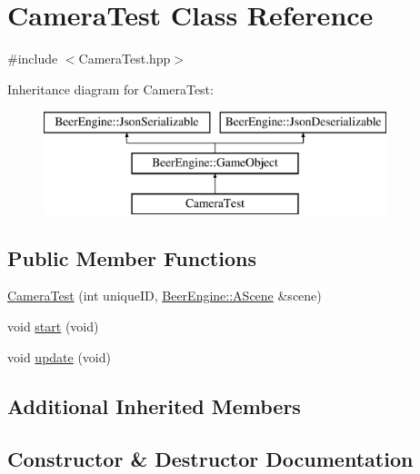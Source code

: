 \hypertarget{class_camera_test}{}\section{Camera\+Test Class Reference}
\label{class_camera_test}


{\ttfamily \#include $<$Camera\+Test.\+hpp$>$}

Inheritance diagram for Camera\+Test\+:\begin{figure}[H]
\begin{center}
\leavevmode
\includegraphics[height=3.000000cm]{class_camera_test}
\end{center}
\end{figure}
\subsection*{Public Member Functions}
\begin{DoxyCompactItemize}
\item 
\mbox{\hyperlink{class_camera_test_a87bcce0ea69a1a731e9e7743ecff602f}{Camera\+Test}} (int unique\+ID, \mbox{\hyperlink{class_beer_engine_1_1_a_scene}{Beer\+Engine\+::\+A\+Scene}} \&scene)
\item 
void \mbox{\hyperlink{class_camera_test_a33618b16d2906b67b68e55ad15a8a33b}{start}} (void)
\item 
void \mbox{\hyperlink{class_camera_test_a5bacc3399e57aa311e8d5ea39c9865bf}{update}} (void)
\end{DoxyCompactItemize}
\subsection*{Additional Inherited Members}


\subsection{Constructor \& Destructor Documentation}
\mbox{\label{class_camera_test_a87bcce0ea69a1a731e9e7743ecff602f}} 
